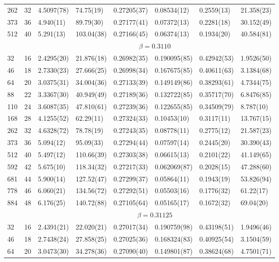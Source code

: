 \documentclass[12pt]{article}
\begin{document}
\begin{table}
\begin{tabular}{llllllll}
262 & 32 & 4.5097(78) & 74.75(19) & 0.27205(37) & 0.08534(12) & 0.2559(13) & 21.358(23)\\ 
373 & 36 & 4.940(11) & 89.79(30) & 0.27177(41) & 0.07372(13) & 0.2281(18) & 30.152(49)\\ 
512 & 40 & 5.291(13) & 103.04(38) & 0.27166(45) & 0.06374(13) & 0.1934(20) & 40.584(81)\\ 
\hline 
  & & \multicolumn{6}{c}{$ \beta = 0.3110 $} \\ 
 \hline 
32 & 16 & 2.4295(20) & 21.876(18) & 0.26982(35) & 0.190095(85) & 0.42942(53) & 1.9526(50)\\ 
46 & 18 & 2.7330(23) & 27.666(25) & 0.26998(34) & 0.167675(85) & 0.40611(63) & 3.1384(68)\\ 
64 & 20 & 3.0375(31) & 34.004(36) & 0.27133(39) & 0.149149(86) & 0.38293(61) & 4.7344(75)\\ 
88 & 22 & 3.3367(30) & 40.949(49) & 0.27189(36) & 0.132722(85) & 0.35717(70) & 6.8476(85)\\ 
110 & 24 & 3.6087(35) & 47.810(61) & 0.27239(36) & 0.122655(85) & 0.34509(79) & 8.787(10)\\ 
168 & 28 & 4.1255(52) & 62.29(11) & 0.27324(33) & 0.10453(10) & 0.3117(11) & 13.767(15)\\ 
262 & 32 & 4.6328(72) & 78.78(19) & 0.27243(35) & 0.08778(11) & 0.2775(12) & 21.587(23)\\ 
373 & 36 & 5.094(12) & 95.09(33) & 0.27294(44) & 0.07597(14) & 0.2445(20) & 30.390(43)\\ 
512 & 40 & 5.497(12) & 110.66(39) & 0.27303(38) & 0.06615(13) & 0.2101(22) & 41.149(65)\\ 
592 & 42 & 5.675(10) & 118.34(32) & 0.27217(33) & 0.062069(87) & 0.2028(15) & 47.288(60)\\ 
681 & 44 & 5.900(14) & 127.52(47) & 0.27299(37) & 0.05864(11) & 0.1943(19) & 53.826(94)\\ 
778 & 46 & 6.060(21) & 134.56(72) & 0.27292(51) & 0.05503(16) & 0.1776(32) & 61.22(17)\\ 
884 & 48 & 6.176(25) & 140.72(88) & 0.27105(64) & 0.05165(17) & 0.1672(32) & 69.04(20)\\ 
\hline 
  & & \multicolumn{6}{c}{$ \beta = 0.31125 $} \\ 
 \hline 
32 & 16 & 2.4391(21) & 22.020(21) & 0.27017(34) & 0.190759(98) & 0.43198(51) & 1.9496(46)\\ 
46 & 18 & 2.7438(24) & 27.858(25) & 0.27025(36) & 0.168324(83) & 0.40925(54) & 3.1504(59)\\ 
64 & 20 & 3.0473(30) & 34.278(36) & 0.27090(40) & 0.149801(87) & 0.38624(68) & 4.7501(71)\\ 

\end{tabular}
\end{table}
\end{document}
